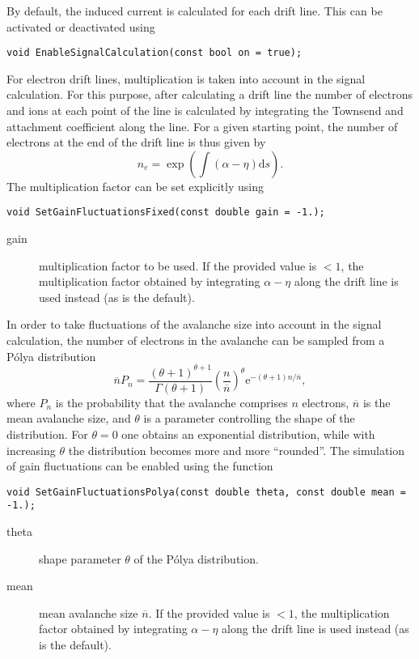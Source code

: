 By default, the induced current is calculated for each drift line.
This can be activated or deactivated using
\begin{lstlisting}
void EnableSignalCalculation(const bool on = true);
\end{lstlisting}

For electron drift lines, multiplication is taken into account in the signal 
calculation. For this purpose, after calculating a drift line
the number of electrons and ions at each point of the line is calculated 
by integrating the Townsend and attachment coefficient along the line. 
For a given starting point, 
the number of electrons at the end of the drift line is thus given by 
\begin{equation*}
  n_{e} = \exp\left(\int\left(\alpha - \eta\right)\text{d}s\right).
\end{equation*}
The multiplication factor can be set explicitly using
\begin{lstlisting}
void SetGainFluctuationsFixed(const double gain = -1.);
\end{lstlisting}
\begin{description}
  \item[gain] multiplication factor to be used. 
  If the provided value is $< 1$, the multiplication factor 
  obtained by integrating $\alpha - \eta$ along the 
  drift line is used instead (as is the default).
\end{description} 

In order to take fluctuations of the avalanche size into account in 
the signal calculation, the number of electrons in the avalanche 
can be sampled from a P\'olya distribution \cite{Alkhazov1970}
\begin{equation*}
 \overline{n}P_{n} = \frac{\left(\theta + 1\right)^{\theta + 1}}{\Gamma\left(\theta + 1\right)}\left(\frac{n}{\overline{n}}\right)^{\theta}\text{e}^{-\left(\theta + 1\right)n/\overline{n}},
\end{equation*}
where $P_{n}$ is the probability that the avalanche comprises $n$ electrons, 
$\overline{n}$ is the mean avalanche size, and $\theta$ is a parameter 
controlling the shape of the distribution. For $\theta = 0$ one obtains an 
exponential distribution, while with increasing $\theta$ the distribution becomes 
more and more ``rounded''. The simulation of gain fluctuations can be enabled using 
the function 
\begin{lstlisting}
void SetGainFluctuationsPolya(const double theta, const double mean = -1.);
\end{lstlisting}
\begin{description}
  \item[theta] shape parameter $\theta$ of the P\'olya distribution.
  \item[mean] mean avalanche size $\overline{n}$. 
  If the provided value is $< 1$, the multiplication factor 
  obtained by integrating $\alpha - \eta$ along the 
  drift line is used instead (as is the default).
\end{description}

